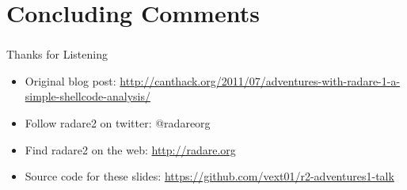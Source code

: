 \documentclass{beamer}
\begin{document}
\section{Concluding Comments}
\begin{frame}[fragile]
  \frametitle{\insertsection}

\begin{block}{Thanks for Listening}
  \begin{itemize}
  \item Original blog post:
\url{http://canthack.org/2011/07/adventures-with-radare-1-a-simple-shellcode-analysis/}\\
  \item Follow radare2 on twitter: @radareorg\\
  \item Find radare2 on the web: \url{http://radare.org}\
  \item Source code for these slides: \url{https://github.com/vext01/r2-adventures1-talk}
  \end{itemize}
\end{block}

\end{frame}
\end{document}
